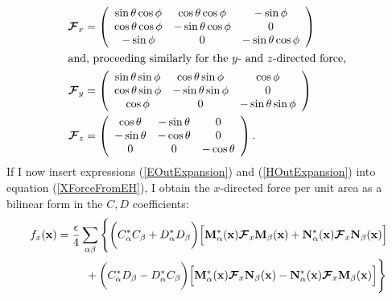\documentclass[letterpaper]{article}
\begin{document}
\begin{align}
\boldsymbol{\mathcal{F}}_x
&=\left(\begin{array}{ccc} 
 \sin\theta \cos\phi & \cos\theta \cos\phi & -\sin\phi \\
 \cos\theta \cos\phi & -\sin\theta \cos\phi &        0 \\
 -\sin\phi           &                    0 & -\sin\theta\cos\phi \\
 \end{array}\right)
\\
\intertext{and, proceeding similarly for the $y$- and $z$-directed
           force, }
\boldsymbol{\mathcal{F}}_y
&=\left(\begin{array}{ccc} 
 \sin\theta \sin\phi & \cos\theta \sin\phi &  \cos\phi \\
 \cos\theta \sin\phi & -\sin\theta \sin\phi &        0 \\
  \cos\phi           &                    0 & -\sin\theta\sin\phi \\
 \end{array}\right)
\\
\boldsymbol{\mathcal{F}}_z
&=\left(\begin{array}{ccc} 
  \cos\theta & -\sin\theta & 0          \\
 -\sin\theta & -\cos\theta & 0          \\
           0 &           0 & -\cos\theta \\
 \end{array}\right).
\end{align}
\noindent
If I now insert expressions (\ref{EOutExpansion}) and (\ref{HOutExpansion}) 
into equation (\ref{XForceFromEH}), I obtain the $x$-directed
force per unit area as a bilinear form in the $C,D$ coefficients:
\begin{align}
 f_x(\mathbf{x})
&=\frac{\epsilon}{4}\sum_{\alpha\beta}
  \Bigg\{ \bigg(C_\alpha^* C_\beta + D_\alpha^* D_\beta \bigg)
          \Big[ \mathbf{M}_\alpha^*(\mathbf{x}) \boldsymbol{\mathcal{F}}_x \mathbf{M}_\beta(\mathbf{x}) 
               +\mathbf{N}_\alpha^*(\mathbf{x}) \boldsymbol{\mathcal{F}}_x \mathbf{N}_\beta(\mathbf{x}) 
          \Big]
\nonumber\\
&\hspace{0.35in}
       +
        \bigg(C_\alpha^* D_\beta - D_\alpha^* C_\beta \bigg)
        \Big[  \mathbf{M}_\alpha^*(\mathbf{x}) \boldsymbol{\mathcal{F}}_x \mathbf{N}_\beta(\mathbf{x}) 
              -\mathbf{N}_\alpha^*(\mathbf{x}) \boldsymbol{\mathcal{F}}_x \mathbf{M}_\beta(\mathbf{x})
        \Big]
 \Bigg\}
\label{fxFromCD}
\end{align}
\end{document}
